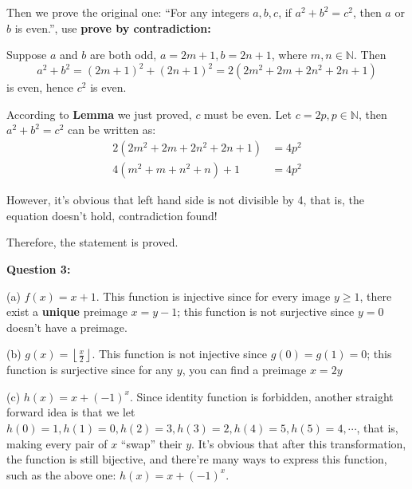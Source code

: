 \documentclass[a4paper,12pt]{article}
\begin{document}
\begin{spacing}{1.4}
    \setlength{\parindent}{2em}

    Then we prove the original one: 
    ``For any integers $a,b,c$, if $a^2+b^2=c^2$, then $a$ or $b$ is even.'',
    use \textbf{prove by contradiction: }

    Suppose $a$ and $b$ are both odd, $a=2m+1, b=2n+1$, 
    where $m,n\in \mathbb{N}$. 
    Then $$a^2+b^2=(2m+1)^2+(2n+1)^2=2(2m^2+2m+2n^2+2n+1)$$ is even, 
    hence $c^2$ is even.

    According to \textbf{Lemma} we just proved, $c$ must be even.
    Let $c=2p, p\in \mathbb{N}$,
    then $a^2+b^2=c^2$ can be written as:
    \begin{align*}
        2(2m^2+2m+2n^2+2n+1)&=4p^2 \\
        4(m^2+m+n^2+n)+1&=4p^2
    \end{align*}

    However, it's obvious that left hand side is not divisible by 4,
    that is, the equation doesn't hold, contradiction found!

    Therefore, the statement is proved.

    \vspace{30px}

    \setlength{\parindent}{0em}
    \textbf{Question 3:}

    (a) $f(x)=x+1$. 
    This function is injective since for every image $y\ge 1$,
    there exist a \textbf{unique} preimage $x=y-1$; 
    this function is not surjective since $y=0$ doesn't have a preimage.

    \vspace{10px}

    (b) $\displaystyle g(x)=\left\lfloor \frac{x}{2} \right\rfloor$.
    This function is not injective since $g(0)=g(1)=0$;
    this function is surjective since for any $y$, you can find
    a preimage $x=2y$

    \vspace{10px}

    (c) $h(x)=x+(-1)^x$. 
    Since identity function is forbidden, another straight forward idea
    is that we let 
    $h(0)=1, h(1)=0, h(2)=3, h(3)=2, h(4)=5, h(5)=4, \cdots$, that is, making
    every pair of $x$ ``swap'' their $y$. 
    It's obvious that after this transformation, the function is still
    bijective, and there're many ways to express this function, 
    such as the above one: $h(x)=x+(-1)^x$.


    \vspace{10px}


\end{spacing}
\end{document}
